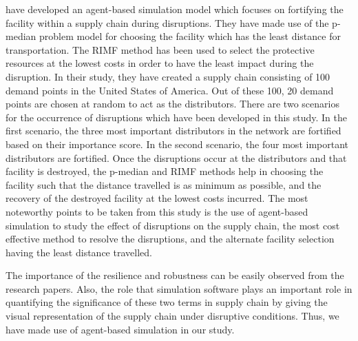 \citep{Li2018} have developed an agent-based simulation model which focuses on fortifying the facility within a supply chain during disruptions. They have made use of the p-median problem model for choosing the facility which has the least distance for transportation. The RIMF method has been used to select the protective resources at the lowest costs in order to have the least impact during the disruption. In their study, they have created a supply chain consisting of 100 demand points in the United States of America. Out of these 100, 20 demand points are chosen at random to act as the distributors.  There are two scenarios for the occurrence of disruptions which have been developed in this study. In the first scenario, the three most important distributors in the network are fortified based on their importance score. In the second scenario, the four most important distributors are fortified. Once the disruptions occur at the distributors and that facility is destroyed, the p-median and RIMF methods help in choosing the facility such that the distance travelled is as minimum as possible, and the recovery of the destroyed facility at the lowest costs incurred. The most noteworthy points to be taken from this study is the use of agent-based simulation to study the effect of disruptions on the supply chain, the most cost effective method to resolve the disruptions, and the alternate facility selection having the least distance travelled.

The importance of the resilience and robustness can be easily observed from the research papers. Also, the role that simulation software plays an important role in quantifying the significance of these two terms in supply chain by giving the visual representation of the supply chain under disruptive conditions. Thus, we have made use of agent-based simulation in our study.

